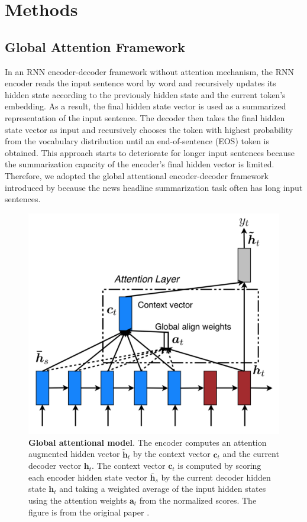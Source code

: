 \section{Methods}
\label{sec: method}

\subsection{Global Attention Framework}
In an RNN encoder-decoder framework without attention mechanism, the RNN encoder reads the input sentence word by word and recursively updates its hidden state according to the previously hidden state and the current token's embedding.
As a result, the final hidden state vector is used as a summarized representation of the input sentence.
The decoder then takes the final hidden state vector as input and recursively chooses the token with highest probability from the vocabulary distribution until an end-of-sentence (EOS) token is obtained. This approach starts to deteriorate for longer input sentences because the summarization capacity of the encoder's final hidden vector is limited. 
Therefore, we adopted the global attentional encoder-decoder framework introduced by \cite{luong2015effective} because the news headline summarization task often has long input sentences. 

\begin{figure}
\centering
\includegraphics[width=\linewidth]{figures/luong2015.png}
\vspace{-8mm}
\caption{\textbf{Global attentional model}. The encoder computes an attention augmented hidden vector $\bm{\tilde h}_t$ by the context vector $\bm{c}_t$ and the current decoder vector $\bm{h}_t$. The context vector $\bm{c}_t$ is computed by
scoring each encoder hidden state vector $\bm{\bar h}_s$ by the current decoder hidden state $\bm{h}_t$ and taking a weighted average of the input hidden states using the attention weights $\bm{a}_t$ from the normalized scores. The figure is from the original paper \cite{luong2015effective}.}
\label{fig: luong2015}
\end{figure}

